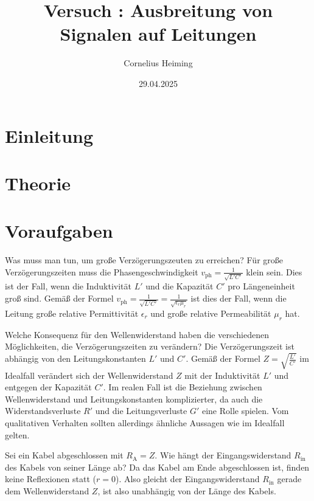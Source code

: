 \documentclass[ngerman]{scrartcl}
\author{Cornelius Heiming}
\title{Versuch \nummer :  Ausbreitung von Signalen auf Leitungen}
\date{29.04.2025}
\theoremstyle{definition}
\begin{document}
	\maketitle
	\section{Einleitung}
	\section{Theorie}
	\section{Voraufgaben}
		\begin{voraufgabe}{Was muss man tun, um große Verzögerungszeuten zu erreichen?}
			Für große Verzögerungszeiten muss die Phasengeschwindigkeit $v_\mathrm{ph} = \frac{1}{\sqrt{L'C'}}$ klein sein. Dies ist der Fall, wenn die Induktivität $L'$ und die Kapazität $C'$ pro Längeneinheit groß sind. Gemäß der Formel $v_\mathrm{ph} = \frac{1}{\sqrt{L'C'}} = \frac{1}{\sqrt{\epsilon_r \mu_r}}$ ist dies der Fall, wenn die Leitung große relative Permittivität $\epsilon_r$ und große relative Permeabilität $\mu_r$ hat.
		\end{voraufgabe}
		\begin{voraufgabe}{Welche Konsequenz für den Wellenwiderstand haben die verschiedenen Möglichkeiten, die Verzögerungszeiten zu verändern?}
			Die Verzögerungszeit ist abhängig von den Leitungskonstanten $L'$ und $C'$. Gemäß der Formel $Z = \sqrt{\frac{L'}{C'}}$ im Idealfall verändert sich der Wellenwiderstand $Z$ mit der Induktivität $L'$ und entgegen der Kapazität $C'$. Im realen Fall ist die Beziehung zwischen Wellenwiderstand und Leitungskonstanten komplizierter, da auch die Widerstandsverluste $R'$ und die Leitungsverluste $G'$ eine Rolle spielen. Vom qualitativen Verhalten sollten allerdings ähnliche Aussagen wie im Idealfall gelten.
		\end{voraufgabe}
		\begin{voraufgabe}{Sei ein Kabel abgeschlossen mit $R_\mathrm{A} = Z$. Wie hängt der Eingangswiderstand $R_\mathrm{in}$ des Kabels von seiner Länge ab?}
			Da das Kabel am Ende abgeschlossen ist, finden keine Reflexionen statt ($r=0$). Also gleicht der Eingangswiderstand $R_\mathrm{in}$ gerade dem Wellenwiderstand $Z$, ist also unabhängig von der Länge des Kabels. 
		\end{voraufgabe}
\end{document}
